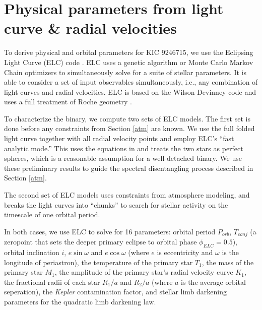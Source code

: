 \section{Physical parameters from light curve \& radial velocities}\label{model}
To derive physical and orbital parameters for KIC 9246715, we use the Eclipsing Light Curve (ELC) code \citep{oro00}. ELC uses a genetic algorithm or Monte Carlo Markov Chain optimizers to simultaneously solve for a suite of stellar parameters. It is able to consider a set of input observables simultaneously, i.e., any combination of light curves and radial velocities. ELC is based on the Wilson-Devinney code \citep{wil71} and uses a full treatment of Roche geometry \citep{avn75}.

To characterize the binary, we compute two sets of ELC models. The first set is done before any constraints from Section \ref{atm} are known. We use the full folded light curve together with all radial velocity points and employ ELC's ``fast analytic mode.'' This uses the equations in \citep{gim06} and treats the two stars as perfect spheres, which is a reasonable assumption for a well-detached binary. We use these preliminary results to guide the spectral disentangling process described in Section \ref{atm}.

The second set of ELC models uses constraints from atmosphere modeling, and breaks the light curves into ``chunks'' to search for stellar activity on the timescale of one orbital period.

In both cases, we use ELC to solve for 16 parameters: orbital period $P_{orb}$, $T_{conj}$ (a zeropoint that sets the deeper primary eclipse to orbital phase $\phi_{ELC} = 0.5$), orbital inclination $i$, $e \sin \omega$ and $e \cos \omega$ (where $e$ is eccentricity and $\omega$ is the longitude of periastron), the temperature of the primary star $T_1$, the mass of the primary star $M_1$, the amplitude of the primary star's radial velocity curve $K_1$, the fractional radii of each star $R_1/a$ and $R_2/a$ (where $a$ is the average orbital seperation), the \emph{Kepler} contamination factor, and stellar limb darkening parameters for the quadratic limb darkening law. 


%
